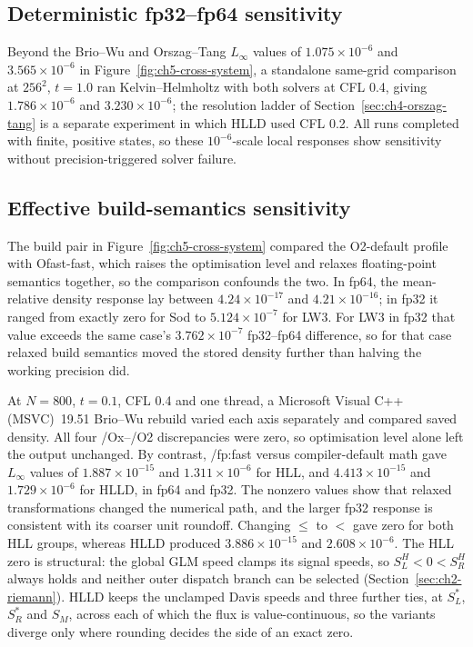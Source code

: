 \subsection{Deterministic fp32--fp64 sensitivity}
\label{sec:ch5-deterministic-precision}

Beyond the Brio--Wu and Orszag--Tang $L_\infty$ values of
$1.075\times10^{-6}$ and $3.565\times10^{-6}$ in
Figure~\ref{fig:ch5-cross-system}, a standalone same-grid comparison at
$256^2$, $t=1.0$ ran Kelvin--Helmholtz with both solvers at CFL 0.4, giving
$1.786\times10^{-6}$ and $3.230\times10^{-6}$; the resolution ladder of
Section~\ref{sec:ch4-orszag-tang} is a separate experiment in which HLLD used
CFL 0.2. All runs completed with finite, positive states, so these
$10^{-6}$-scale local responses show sensitivity without precision-triggered
solver failure.

\subsection{Effective build-semantics sensitivity}
\label{sec:ch5-build-sensitivity}

The build pair in Figure~\ref{fig:ch5-cross-system} compared the O2-default
profile with Ofast-fast, which raises the optimisation level and relaxes
floating-point semantics together, so the comparison confounds the two. In
fp64, the mean-relative density response lay between $4.24\times10^{-17}$ and
$4.21\times10^{-16}$; in fp32 it ranged from exactly zero for Sod to
$5.124\times10^{-7}$ for LW3. For LW3 in fp32 that value exceeds the same
case's $3.762\times10^{-7}$ fp32--fp64 difference, so for that case relaxed
build semantics moved the stored density further than halving the working
precision did.

At $N=800$, $t=0.1$, CFL 0.4 and one thread, a Microsoft Visual C++
(MSVC)~19.51 Brio--Wu rebuild varied each axis separately and compared
saved density. All four /Ox--/O2 discrepancies were zero, so optimisation
level alone left the output unchanged.
By contrast, /fp:fast versus compiler-default math
\citep{microsoftMsvcFp2021} gave $L_\infty$ values of
$1.887\times10^{-15}$ and $1.311\times10^{-6}$ for HLL, and
$4.413\times10^{-15}$ and $1.729\times10^{-6}$ for HLLD, in fp64 and fp32.
The nonzero values show that relaxed transformations changed the numerical
path, and the larger fp32 response is consistent with its coarser unit
roundoff. Changing
$\leq$ to $<$ gave zero for both HLL groups, whereas HLLD produced
$3.886\times10^{-15}$ and $2.608\times10^{-6}$. The HLL zero is structural: the global GLM speed clamps its signal speeds, so
$S_L^{H}<0<S_R^{H}$ always holds and neither outer dispatch branch can be
selected (Section~\ref{sec:ch2-riemann}). HLLD keeps the unclamped Davis speeds
and three further ties, at $S_L^*$, $S_R^*$ and $S_M$, across each of which the
flux is value-continuous, so the variants diverge only where rounding decides
the side of an exact zero.

